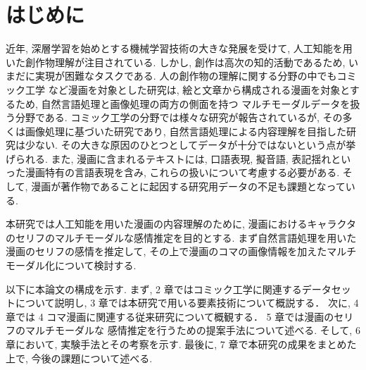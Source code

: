 \newpage
\changeindent{0cm}
\section{はじめに}
\changeindent{2cm}
近年, 深層学習を始めとする機械学習技術の大きな発展を受けて, 人工知能を用いた創作物理解が注目されている.
しかし, 創作は高次の知的活動であるため, いまだに実現が困難なタスクである.
人の創作物の理解に関する分野の中でもコミック工学 \cite{comic} など漫画を対象とした研究は,
絵と文章から構成される漫画を対象とするため, 自然言語処理と画像処理の両方の側面を持つ
マルチモーダルデータを扱う分野である.
コミック工学の分野では様々な研究が報告されているが,
その多くは画像処理に基づいた研究であり,
自然言語処理による内容理解を目指した研究は少ない.
その大きな原因のひとつとしてデータが十分ではないという点が挙げられる.
また, 漫画に含まれるテキストには, 口語表現, 擬音語, 表記揺れといった漫画特有の言語表現を含み,
これらの扱いについて考慮する必要がある.
そして, 漫画が著作物であることに起因する研究用データの不足も課題となっている.

本研究では人工知能を用いた漫画の内容理解のために,
漫画におけるキャラクタのセリフのマルチモーダルな感情推定を目的とする.
まず自然言語処理を用いた漫画のセリフの感情を推定して,
その上で漫画のコマの画像情報を加えたマルチモーダル化について検討する.

以下に本論文の構成を示す.
まず, 2 章ではコミック工学に関連するデータセットについて説明し,
3 章では本研究で用いる要素技術について概説する．
次に, 4 章では 4 コマ漫画に関連する従来研究について概観する．
5 章では漫画のセリフのマルチモーダルな
感情推定を行うための提案手法について述べる.
そして, 6 章において, 実験手法とその考察を示す.
最後に, 7 章で本研究の成果をまとめた上で, 今後の課題について述べる.
